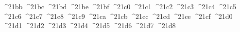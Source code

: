 {  ^^^^21bb%
  ^^^^21bc%
  ^^^^21bd%
  ^^^^21be%
  ^^^^21bf%
  ^^^^21c0%
  ^^^^21c1%
  ^^^^21c2%
  ^^^^21c3%
  ^^^^21c4%
  ^^^^21c5%
  ^^^^21c6%
  ^^^^21c7%
  ^^^^21c8%
  ^^^^21c9%
  ^^^^21ca%
  ^^^^21cb%
  ^^^^21cc%
  ^^^^21cd%
  ^^^^21ce%
  ^^^^21cf%
  ^^^^21d0%
  ^^^^21d1%
  ^^^^21d2%
  ^^^^21d3%
  ^^^^21d4%
  ^^^^21d5%
  ^^^^21d6%
  ^^^^21d7%
  ^^^^21d8%
}
